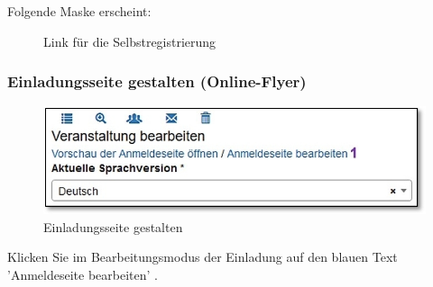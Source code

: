Folgende Maske erscheint:

\begin{figure}[H]
\caption{Link für die Selbstregistrierung}
\end{figure}

\pagebreak
\subsubsection{Einladungsseite gestalten (Online-Flyer)}
\label{bkm:Ref112017101}

\begin{figure}   
  \vspace{-30pt}      
  \begin{center}
    \includegraphics[width=1\linewidth]{../chapters/10_CRM/pictures/crm_Einladung_gestalten_Link.jpg}
  \end{center}
  \vspace{-20pt}
  \caption{Einladungsseite gestalten}
  \vspace{-10pt}
\end{figure}

Klicken Sie im Bearbeitungsmodus der Einladung auf den blauen Text 'Anmeldeseite bearbeiten' . 


